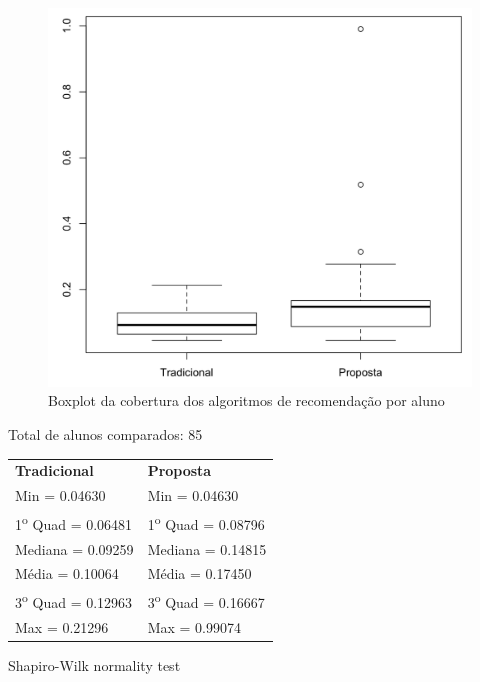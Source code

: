 \begin{figure}[htb]
  \caption{\label{fig:coverage-boxplot}Boxplot da cobertura dos algoritmos de recomendação por aluno}
  \begin{center}
      \includegraphics[scale=0.4]{./Figuras/coverage-boxplot.png}
  \end{center}
\end{figure}

\noindent
Total de alunos comparados: 85

\begin{table}[h]
\begin{tabular}{p{}p{}}
\textbf{Tradicional} & \textbf{Proposta}\\
Min = 0.04630 & Min = 0.04630\\
1\textsuperscript{o} Quad = 0.06481 & 1\textsuperscript{o} Quad = 0.08796\\
Mediana = 0.09259 & Mediana = 0.14815\\
Média = 0.10064 & Média = 0.17450\\
3\textsuperscript{o} Quad = 0.12963 & 3\textsuperscript{o} Quad = 0.16667\\
Max = 0.21296 & Max = 0.99074\\
\end{tabular}
\end{table}

    Shapiro-Wilk normality test

